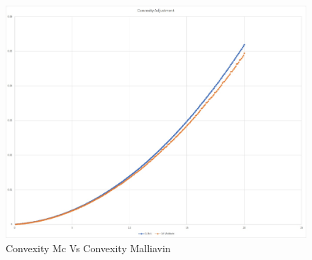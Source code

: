 \documentclass[a4paper,10pt]{article}
\newcommand{\1}{\mathbf{1}}
\begin{document}
\begin{figure}[h]
	\begin{center}
		\includegraphics[scale=0.3]{Figures/future_convexity.jpg}
		\caption{Convexity Mc Vs Convexity Malliavin}
	\end{center}
\end{figure} 
\end{document}
